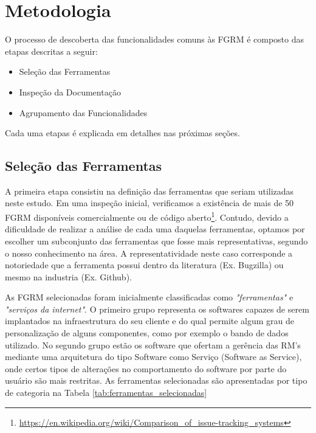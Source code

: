 \section{Metodologia}
\label{sec:metodologia}

O processo de descoberta das funcionalidades comuns às FGRM é composto das etapas descritas a
seguir:

\begin{itemize}
	\item Seleção das Ferramentas
	\item Inspeção da Documentação
	\item Agrupamento das Funcionalidades
\end{itemize}

Cada uma etapas é explicada em detalhes nas próximas seções. 

\subsection{Seleção das Ferramentas}
\label{ssub:Seleção das Ferramentas}

A primeira etapa consistiu na definição das ferramentas que seriam utilizadas neste estudo. Em uma
inspeção inicial, verificamos a existência de mais de 50 FGRM disponíveis comercialmente ou de
código aberto\footnote{\url{https://en.wikipedia.org/wiki/Comparison_of_issue-tracking_systems}}. Contudo,
devido a dificuldade de realizar a análise de cada uma daquelas ferramentas, optamos por escolher um
subconjunto das ferramentas que fosse mais representativas, segundo o nosso conhecimento na área. A
representatividade neste caso corresponde a notoriedade que a ferramenta possui dentro da literatura
(Ex. Bugzilla) ou mesmo na industria (Ex. Github).

As FGRM selecionadas foram inicialmente classificadas como \textit{"ferramentas"} e
\textit{"serviços da internet"}. O primeiro grupo representa os softwares capazes de serem implantados
na infraestrutura do seu cliente e do qual permite algum grau de personalização de alguns
componentes, como por exemplo o bando de dados utilizado. No segundo grupo estão os software que
ofertam a gerência das RM's mediante uma arquitetura do tipo Software como Serviço (Software as
Service), onde certos tipos de alterações no comportamento do software por parte do usuário são mais restritas. As
ferramentas selecionadas são apresentadas por tipo de categoria na Tabela
\ref{tab:ferramentas_selecionadas}

